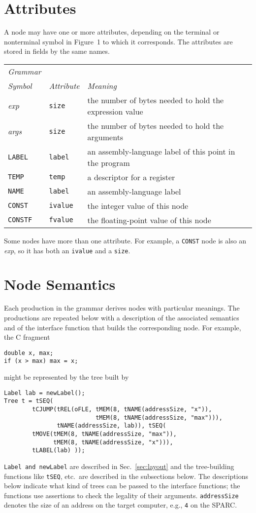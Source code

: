 \section{Attributes}\label{sec:attributes}

A node may have one or more attributes, depending on
the terminal or nonterminal symbol in Figure~1 to which it corresponds.
The attributes are stored in fields by the same names.
\begin{center}
\begin{tabular}{lll}
\sl Grammar \\
\sl Symbol	& \sl Attribute	& \sl Meaning \\ \hline
\it exp		& \tt size	& the number of bytes needed to hold the expression value \\
\it args	& \tt size	& the number of bytes needed to hold the arguments \\
\tt LABEL	& \tt label	& an assembly-language label of this point in the program \\
\tt TEMP	& \tt temp	& a descriptor for a register \\
\tt NAME	& \tt label	& an assembly-language label \\
\tt CONST	& \tt ivalue	& the integer value of this node \\
\tt CONSTF	& \tt fvalue	& the floating-point value of this node \\
\end{tabular}
\end{center}
Some nodes have more than one attribute. For example, a \verb|CONST|
node is also an {\it exp}, so it has both an \verb|ivalue| and a \verb|size|.

\section{Node Semantics}

Each production in the grammar derives nodes with particular meanings.
The productions are repeated below with a description of
the associated semantics and of the interface function that builds the
corresponding node. For example, the C fragment
\begin{verbatim}
double x, max;
if (x > max) max = x;
\end{verbatim}
might be represented by the tree built by
\begin{verbatim}
Label lab = newLabel();
Tree t = tSEQ(
        tCJUMP(tREL(oFLE, tMEM(8, tNAME(addressSize, "x")),
                          tMEM(8, tNAME(addressSize, "max"))),
               tNAME(addressSize, lab)), tSEQ(
        tMOVE(tMEM(8, tNAME(addressSize, "max")),
              tMEM(8, tNAME(addressSize, "x"))),
        tLABEL(lab) ));
\end{verbatim}
\verb|Label and |\verb|newLabel| are described in Sec.~\ref{sec:layout} and the tree-building
functions like \verb|tSEQ|, etc.\ are described in the subsections below.
The descriptions below indicate what kind of trees
can be passed to the interface functions;
the functions use assertions to check the legality of their arguments.
\verb|addressSize| denotes the size of an address on the target
computer, e.g., \verb|4| on the SPARC.

